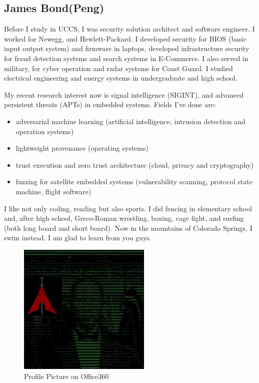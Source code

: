 \subsection{James Bond(Peng)}
Before I study in UCCS, I was security solution architect and software engineer. I worked for Newegg, and Hewlett-Packard. I developed security for BIOS (basic input output system) and firmware in laptops, developed infrastructure security for fraud detection systems and search systems in E-Commerce. I also served in military, for cyber operation and radar systems for Coast Guard. I studied electrical engineering and energy systems in undergraduate and high school.

My recent research interest now is signal intelligence (SIGINT), and advanced persistent threats (APTs) in embedded systems. Fields I've done are: 

\begin{itemize}
\item adversarial machine learning (artificial intelligence, intrusion detection and operation systems)
\item lightweight provenance (operating systems)
\item trust execution and zero trust architecture (cloud, privacy and cryptography)
\item fuzzing for satellite embedded systems (vulnerability scanning, protocol state machine, flight software)
\end{itemize}

I like not only coding, reading but also sports. I did fencing in elementary school and, after high school, Greco-Roman wrestling, boxing, cage fight, and surfing (both long board and short board). Now in the mountains of Colorado Springs, I swim instead. I am glad to learn from you guys. 

\begin{figure}[h]
  \centering
  \includegraphics[width=180pt]{flainggg.jpg}
  \caption{Profile Picture on Office360}
  \label{fig.q1a}
\end{figure}

